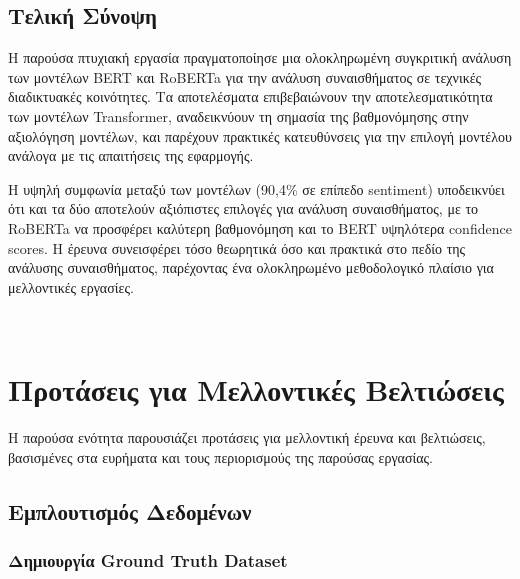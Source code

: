 \documentclass[a4paper,11pt,oneside,openany]{ioniothesis}
\begin{document}
\subsection{Τελική Σύνοψη}
\label{sec:Τελική Σύνοψη}

Η παρούσα πτυχιακή εργασία πραγματοποίησε μια ολοκληρωμένη συγκριτική ανάλυση των μοντέλων BERT και RoBERTa για την ανάλυση συναισθήματος σε τεχνικές διαδικτυακές κοινότητες. Τα αποτελέσματα επιβεβαιώνουν την αποτελεσματικότητα των μοντέλων Transformer, αναδεικνύουν τη σημασία της βαθμονόμησης στην αξιολόγηση μοντέλων, και παρέχουν πρακτικές κατευθύνσεις για την επιλογή μοντέλου ανάλογα με τις απαιτήσεις της εφαρμογής.

Η υψηλή συμφωνία μεταξύ των μοντέλων (90,4\% σε επίπεδο sentiment) υποδεικνύει ότι και τα δύο αποτελούν αξιόπιστες επιλογές για ανάλυση συναισθήματος, με το RoBERTa να προσφέρει καλύτερη βαθμονόμηση και το BERT υψηλότερα confidence scores. Η έρευνα συνεισφέρει τόσο θεωρητικά όσο και πρακτικά στο πεδίο της ανάλυσης συναισθήματος, παρέχοντας ένα ολοκληρωμένο μεθοδολογικό πλαίσιο για μελλοντικές εργασίες.


\\








\section{Προτάσεις για Μελλοντικές Βελτιώσεις}
\label{sec:Προτάσεις για Μελλοντικές Βελτιώσεις}

Η παρούσα ενότητα παρουσιάζει προτάσεις για μελλοντική έρευνα και βελτιώσεις, βασισμένες στα ευρήματα και τους περιορισμούς της παρούσας εργασίας.

\subsection{Εμπλουτισμός Δεδομένων}
\label{sec:Εμπλουτισμός Δεδομένων}

\subsubsection{Δημιουργία Ground Truth Dataset}
\end{document}
